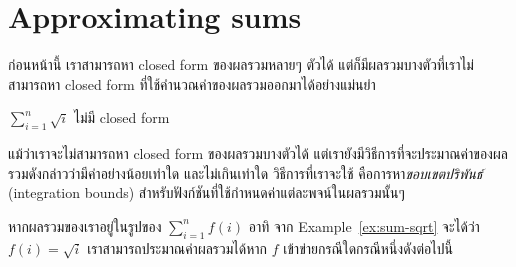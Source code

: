 \section{Approximating sums}

ก่อนหน้านี้ เราสามารถหา closed form ของผลรวมหลายๆ ตัวได้ แต่ก็มีผลรวมบางตัวที่เราไม่สามารถหา closed form ที่ใช้คำนวณค่าของผลรวมออกมาได้อย่างแม่นยำ
%
\begin{example}\label{ex:sum-sqrt}
$\sum_{i=1}^{n}{\sqrt{i}}$ ไม่มี closed form
\end{example}
%
แม้ว่าเราจะไม่สามารถหา closed form ของผลรวมบางตัวได้ แต่เรายังมีวิธีการที่จะประมาณค่าของผลรวมดังกล่าวว่ามีค่าอย่างน้อยเท่าใด และไม่เกินเท่าใด \enskip วิธีการที่เราจะใช้ คือการหา\emph{ขอบเขตปริพันธ์} (integration bounds) สำหรับฟังก์ชันที่ใช้กำหนดค่าแต่ละพจน์ในผลรวมนั้นๆ

หากผลรวมของเราอยู่ในรูปของ $\sum_{i=1}^n{f(i)}$ อาทิ จาก Example~\ref{ex:sum-sqrt} จะได้ว่า $f(i)=\sqrt{i}$ เราสามารถประมาณค่าผลรวมได้หาก $f$ เข้าข่ายกรณีใดกรณีหนึ่งดังต่อไปนี้

\def\incfn{1/1/1.81,2/2/2.89,3/3/3.85,4/4/4.64,5//5.24,6//6.82,7/n-2/7.52,8/n-1/8.39,9/n/9.12,10/n+1/10.49}
\def\decfn{1/1/9.12,2/2/8.39,3/3/7.52,4/4/6.82,5//5.24,6//4.64,7/n-2/3.85,8/n-1/2.89,9/n/1.81,10/n+1/0.61}

\newcommand\smoothplot[2]{%
\begin{tikzpicture}[scale=0.5,every node/.style={scale=0.75}]
\draw (-0.5,0) -- (10.5,0) node[right] {$x$};
\draw (0,-0.5) -- (0,9.5) node[above] {$y$};

\foreach \x/\i/\y [remember=\x-1 as \xprev] in #1 {
  \ifthenelse{\x<5 \OR \x>6}{
    \draw (\x,-0.25) node[below] {\rotatebox{90}{$\i$}} -- (\x,0.25);
    \ifthenelse{\x<4 \OR \x>7 \AND \x<10}{
      \draw (-0.25,\y) node[left] {$f(\i)$} -- (0.25,\y);
      \begin{scope}[on background layer]
        \draw[fill=lightgray] ($(\x,0)+(#2-1,0)$) rectangle node{\rotatebox{90}{$f(\i)$}} ($(\x,\y)+(#2,0)$);
      \end{scope}
      \node[graphpt] (p\x) at (\x,\y) {};
    }{
      \node (p\x) at (\x,\y) {};
    }
  }{
    \node (p\x) at (\x,\y) {};
  }
}
\node [above=0.15in of p5] {$f(x)$};
\draw[smooth] plot coordinates {(p1.center) (p2.center) (p3.center) (p4.center) (p5.center) (p6.center) (p7.center) (p8.center) (p9.center)};

\draw (5.5,-0.25) node[below] {\rotatebox{90}{$\vdots$}};
\draw (-0.25,5.75) node[left] {$\vdots$};
\end{tikzpicture}
}

